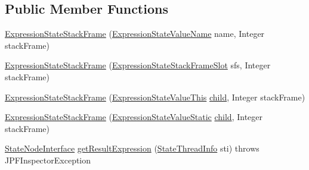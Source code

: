 \subsection*{Public Member Functions}
\begin{DoxyCompactItemize}
\item 
\hyperlink{classgov_1_1nasa_1_1jpf_1_1inspector_1_1server_1_1expression_1_1expressions_1_1_expression_state_stack_frame_ac640b5d4319aa610d5f3d521ce5c0019}{Expression\+State\+Stack\+Frame} (\hyperlink{classgov_1_1nasa_1_1jpf_1_1inspector_1_1server_1_1expression_1_1expressions_1_1_expression_state_value_name}{Expression\+State\+Value\+Name} name, Integer stack\+Frame)
\item 
\hyperlink{classgov_1_1nasa_1_1jpf_1_1inspector_1_1server_1_1expression_1_1expressions_1_1_expression_state_stack_frame_a943f3ec24334a1b6a5dcc8d346829741}{Expression\+State\+Stack\+Frame} (\hyperlink{classgov_1_1nasa_1_1jpf_1_1inspector_1_1server_1_1expression_1_1expressions_1_1_expression_state_stack_frame_slot}{Expression\+State\+Stack\+Frame\+Slot} sfs, Integer stack\+Frame)
\item 
\hyperlink{classgov_1_1nasa_1_1jpf_1_1inspector_1_1server_1_1expression_1_1expressions_1_1_expression_state_stack_frame_ad116090608a2ceb0b364618b57020410}{Expression\+State\+Stack\+Frame} (\hyperlink{classgov_1_1nasa_1_1jpf_1_1inspector_1_1server_1_1expression_1_1expressions_1_1_expression_state_value_this}{Expression\+State\+Value\+This} \hyperlink{classgov_1_1nasa_1_1jpf_1_1inspector_1_1server_1_1expression_1_1_expression_state_unary_operator_a66041b1f569a361549e28a00f7ca5f2f}{child}, Integer stack\+Frame)
\item 
\hyperlink{classgov_1_1nasa_1_1jpf_1_1inspector_1_1server_1_1expression_1_1expressions_1_1_expression_state_stack_frame_ad34c5b59709c84e27510c7f098ab3351}{Expression\+State\+Stack\+Frame} (\hyperlink{classgov_1_1nasa_1_1jpf_1_1inspector_1_1server_1_1expression_1_1expressions_1_1_expression_state_value_static}{Expression\+State\+Value\+Static} \hyperlink{classgov_1_1nasa_1_1jpf_1_1inspector_1_1server_1_1expression_1_1_expression_state_unary_operator_a66041b1f569a361549e28a00f7ca5f2f}{child}, Integer stack\+Frame)
\item 
\hyperlink{interfacegov_1_1nasa_1_1jpf_1_1inspector_1_1server_1_1programstate_1_1_state_node_interface}{State\+Node\+Interface} \hyperlink{classgov_1_1nasa_1_1jpf_1_1inspector_1_1server_1_1expression_1_1expressions_1_1_expression_state_stack_frame_ab3fb33b142e9ebd612a9e347c9132b5a}{get\+Result\+Expression} (\hyperlink{classgov_1_1nasa_1_1jpf_1_1inspector_1_1server_1_1programstate_1_1_state_thread_info}{State\+Thread\+Info} sti)  throws J\+P\+F\+Inspector\+Exception 

\end{DoxyCompactItemize}

